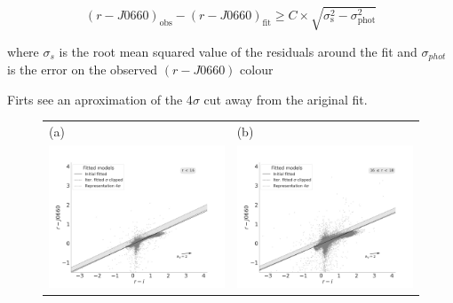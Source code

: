 \documentclass[fleqn,usenatbib]{mnras}
\begin{document}
\begin{equation}
  (r - J0660)_{\mathrm{obs}} - (r - J0660)_{\mathrm{fit}} \geq C \times \sqrt{\sigma^2_{\mathrm{s}} - \sigma^2_{\mathrm{phot}}}
\end{equation}
 
 
where $\sigma_s$ is the root mean squared value of the residuals around
the fit and $\sigma_{phot}$ is the error on the observed $(r - J0660)$ colour

Firts see an aproximation of the  4$\sigma$ cut away from the ariginal fit.

\begin{figure}
  \setlength\tabcolsep{0pt}
  \begin{tabular}{ll}
    (a) & (b) \\
    \includegraphics[trim=10 0 65 20, clip]{Figs/diagram-DR3-errorFlag0-3f-16r}
    & \includegraphics[trim=10 0 65 20, clip]{Figs/diagram-DR3-errorFlag0-3f-16r18}\\

\end{tabular}
\end{figure}
\end{document}
